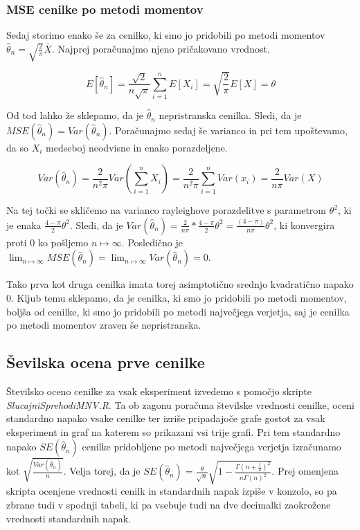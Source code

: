 \documentclass[a4paper, 10pt]{article}
\begin{document}
	\subsubsection{MSE cenilke po metodi momentov}\label{subsubsect: 2C2}
	Sedaj storimo enako še za cenilko, ki smo jo pridobili po metodi momentov $\widehat{\theta}_n = \sqrt{\frac{2}{\pi}}\bar{X}$. Najprej poračunajmo njeno pričakovano vrednost.
	
	\begin{equation*}		
		E[\widehat{\theta}_n] = \frac{\sqrt{2}}{n\sqrt{\pi}} \sum_{i=1}^{n} E[X_i] = \sqrt{\frac{2}{\pi}} E[X] = \theta
	\end{equation*}
	
	Od tod lahko že sklepamo, da je $\widehat{\theta}_n$ nepristranska cenilka. Sledi, da je $MSE(\widehat{\theta}_n) = Var(\widehat{\theta}_n)$. Poračunajmo sedaj še varianco in pri tem upoštevamo, da so $X_i$ medseboj neodvisne in enako porazdeljene.
	
	\begin{equation*}		
		Var(\widehat{\theta}_n) = \frac{2}{n^2\pi}Var(\sum_{i = 1}^{n}X_i) = \frac{2}{n^2 \pi} \sum_{i = 1}^{n}Var(x_i) = \frac{2}{n \pi} Var(X)
	\end{equation*}
	
	Na tej točki se skličemo na varianco rayleighove porazdelitve s parametrom $\theta^2$, ki je enaka $\frac{4 - \pi}{2}\theta^2$. Sledi, da je $Var(\widehat{\theta}_n) = \frac{2}{n\pi} * \frac{4 - \pi}{2}\theta^2 = \frac{(4-\pi)}{n\pi}\theta^2$, ki konvergira proti $0$ ko pošljemo $n\mapsto\infty$. Posledično je $\lim_{n\mapsto\infty}MSE(\widehat{\theta}_n) = \lim_{n\mapsto\infty} Var(\widehat{\theta}_n) =0$.
	
	Tako prva kot druga cenilka imata torej asimptotično srednjo kvadratično napako $0$. Kljub temu sklepamo, da je cenilka, ki smo jo pridobili po metodi momentov, boljša od cenilke, ki smo jo pridobili po metodi največjega verjetja, saj je cenilka po metodi momentov zraven še nepristranska.
	
	\subsection{Ševilska ocena prve cenilke} \label{subsect: 2D}
	
	Številsko oceno cenilke za vsak eksperiment izvedemo s pomočjo skripte \textit{SlucajniSprehodiMNV.R}. Ta ob zagonu poračuna številske vrednosti cenilke, oceni standardno napako vsake cenilke ter izriše pripadajoče grafe gostot za vsak eksperiment in graf na katerem so prikazani vsi trije grafi. Pri tem standardno napako $SE(\widehat{\theta}_n)$ cenilke pridobljene po metodi največjega verjetja izračunamo kot $\sqrt{\frac{Var(\widehat{\theta}_n)}{n}}$. Velja torej, da je $SE(\widehat{\theta}_n) = \frac{\theta}{\sqrt{n}}\sqrt{1 - \frac{\Gamma(n + \frac{1}{2})^2}{n\Gamma(n)^2}}$.
	Prej omenjena skripta ocenjene vrednosti cenilk in standardnih napak izpiše v konzolo, so pa zbrane tudi v spodnji tabeli, ki pa vsebuje tudi na dve decimalki zaokrožene vrednosti standardnih napak.
	
\end{document}
